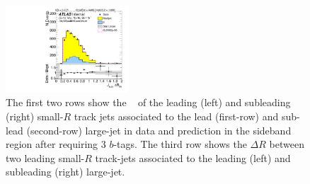 \begin{figure}[htb!]
\begin{center}
\includegraphics[width=0.41\textwidth,angle=-90]{figures/boosted/Sideband/b77_ThreeTag_Sideband_sublHCand_trk_dr.pdf}
  \caption{The first two rows show the \pt~ of the leading (left) and subleading (right) small-$R$ track jets associated to the lead (first-row) and sub-lead (second-row) large-\R jet in data and prediction in the sideband region after requiring 3 $b$-tags. The third row shows the $\Delta R$ between two leading small-$R$ track-jets associated to the leading (left) and subleading (right) large-\R jet. }
  \label{fig:boosted-3b-sideband-ak2}
\end{center}
\end{figure}


